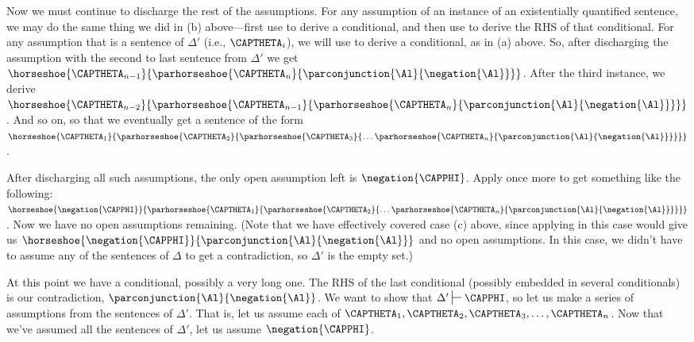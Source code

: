 \begin{PROOF}
Now we must continue to discharge the rest of the assumptions.  For any assumption of an instance of an existentially quantified sentence, we may do the same thing we did in (b) above---first use  to derive a conditional, and then use  to derive the RHS of that conditional.  For any assumption that is a sentence of $\Delta'$ (i.e., $\CAPTHETA_{\integer{i}}$), we will use  to derive a conditional, as in (a) above.  So, after discharging the assumption with the second to last sentence from $\Delta'$ we get $\horseshoe{\CAPTHETA_{\integer{n-1}}}{\parhorseshoe{\CAPTHETA_{\integer{n}}}{\parconjunction{\Al}{\negation{\Al}}}}$.  After the third instance, we derive $\horseshoe{\CAPTHETA_{\integer{n-2}}}{\parhorseshoe{\CAPTHETA_{\integer{n-1}}}{\parhorseshoe{\CAPTHETA_{\integer{n}}}{\parconjunction{\Al}{\negation{\Al}}}}}$.  And so on, so that we eventually get a sentence of the form $\horseshoe{\CAPTHETA_1}{\parhorseshoe{\CAPTHETA_2}{\parhorseshoe{\CAPTHETA_3}{\ldots \parhorseshoe{\CAPTHETA_{\integer{n}}}{\parconjunction{\Al}{\negation{\Al}}}}}}$.

After discharging all such assumptions, the only open assumption left is $\negation{\CAPPHI}$.  Apply  once more to get something like the following: $\horseshoe{\negation{\CAPPHI}}{\parhorseshoe{\CAPTHETA_1}{\parhorseshoe{\CAPTHETA_2}{\ldots \parhorseshoe{\CAPTHETA_{\integer{n}}}{\parconjunction{\Al}{\negation{\Al}}}}}}$.  Now we have no open assumptions remaining.  (Note that we have effectively covered case (c) above, since applying  in this case would give us $\horseshoe{\negation{\CAPPHI}}{\parconjunction{\Al}{\negation{\Al}}}$ and no open assumptions.  In this case, we didn't have to assume any of the sentences of $\Delta$ to get a contradiction, so $\Delta'$ is the empty set.)

At this point we have a conditional, possibly a very long one.  The RHS of the last conditional (possibly embedded in several conditionals) is our contradiction, $\parconjunction{\Al}{\negation{\Al}}$.  We want to show that $\Delta'\sststile{}{}\CAPPHI$, so let us make a series of assumptions from the sentences of $\Delta'$.  That is, let us assume each of $\CAPTHETA_1, \CAPTHETA_2, \CAPTHETA_3, \ldots, \CAPTHETA_{\integer{n}}$.  Now that we've assumed all the sentences of $\Delta'$, let us assume $\negation{\CAPPHI}$.


\end{PROOF}
